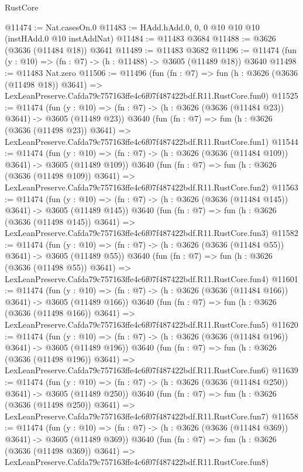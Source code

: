 \begin{lexlean}{RustCore}
\begin{coremodule}
@11474 := Nat.casesOn.{0}
@11483 := HAdd.hAdd.{0, 0, 0} @10 @10 @10 (instHAdd.{0} @10 instAddNat)
@11484 := @11483 @3684
@11488 := @3626 (@3636 (@11484 @18)) @3641
@11489 := @11483 @3682
@11496 := @11474 (fun (y : @10) => (fn : @7) -> (h : @11488) -> @3605 (@11489 @18)) @3640
@11498 := @11483 Nat.zero
@11506 := @11496
    (fun (fn : @7) =>
    fun (h : @3626 (@3636 (@11498 @18)) @3641) =>
    LexLeanPreserve.Cafda79c757163ffe4c6f07f487422bdf.R11.RustCore.fun0)
@11525 := @11474
    (fun (y : @10) => (fn : @7) -> (h : @3626 (@3636 (@11484 @23)) @3641) -> @3605 (@11489 @23))
    @3640
    (fun (fn : @7) =>
    fun (h : @3626 (@3636 (@11498 @23)) @3641) =>
    LexLeanPreserve.Cafda79c757163ffe4c6f07f487422bdf.R11.RustCore.fun1)
@11544 := @11474
    (fun (y : @10) => (fn : @7) -> (h : @3626 (@3636 (@11484 @109)) @3641) -> @3605 (@11489 @109))
    @3640
    (fun (fn : @7) =>
    fun (h : @3626 (@3636 (@11498 @109)) @3641) =>
    LexLeanPreserve.Cafda79c757163ffe4c6f07f487422bdf.R11.RustCore.fun2)
@11563 := @11474
    (fun (y : @10) => (fn : @7) -> (h : @3626 (@3636 (@11484 @145)) @3641) -> @3605 (@11489 @145))
    @3640
    (fun (fn : @7) =>
    fun (h : @3626 (@3636 (@11498 @145)) @3641) =>
    LexLeanPreserve.Cafda79c757163ffe4c6f07f487422bdf.R11.RustCore.fun3)
@11582 := @11474
    (fun (y : @10) => (fn : @7) -> (h : @3626 (@3636 (@11484 @55)) @3641) -> @3605 (@11489 @55))
    @3640
    (fun (fn : @7) =>
    fun (h : @3626 (@3636 (@11498 @55)) @3641) =>
    LexLeanPreserve.Cafda79c757163ffe4c6f07f487422bdf.R11.RustCore.fun4)
@11601 := @11474
    (fun (y : @10) => (fn : @7) -> (h : @3626 (@3636 (@11484 @166)) @3641) -> @3605 (@11489 @166))
    @3640
    (fun (fn : @7) =>
    fun (h : @3626 (@3636 (@11498 @166)) @3641) =>
    LexLeanPreserve.Cafda79c757163ffe4c6f07f487422bdf.R11.RustCore.fun5)
@11620 := @11474
    (fun (y : @10) => (fn : @7) -> (h : @3626 (@3636 (@11484 @196)) @3641) -> @3605 (@11489 @196))
    @3640
    (fun (fn : @7) =>
    fun (h : @3626 (@3636 (@11498 @196)) @3641) =>
    LexLeanPreserve.Cafda79c757163ffe4c6f07f487422bdf.R11.RustCore.fun6)
@11639 := @11474
    (fun (y : @10) => (fn : @7) -> (h : @3626 (@3636 (@11484 @250)) @3641) -> @3605 (@11489 @250))
    @3640
    (fun (fn : @7) =>
    fun (h : @3626 (@3636 (@11498 @250)) @3641) =>
    LexLeanPreserve.Cafda79c757163ffe4c6f07f487422bdf.R11.RustCore.fun7)
@11658 := @11474
    (fun (y : @10) => (fn : @7) -> (h : @3626 (@3636 (@11484 @369)) @3641) -> @3605 (@11489 @369))
    @3640
    (fun (fn : @7) =>
    fun (h : @3626 (@3636 (@11498 @369)) @3641) =>
    LexLeanPreserve.Cafda79c757163ffe4c6f07f487422bdf.R11.RustCore.fun8)

\end{coremodule}
\end{lexlean}
